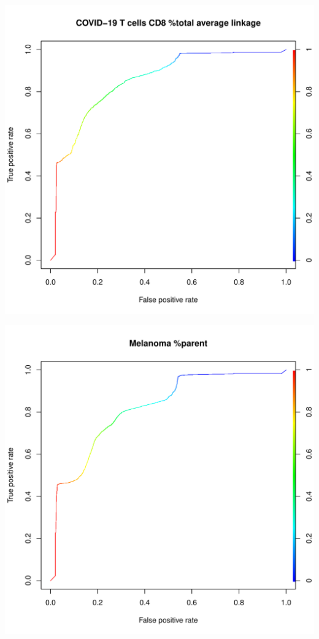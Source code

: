 \documentclass[11pt,a4paper,twoside]{report}\usepackage[]{graphicx}\usepackage[]{color}
\makeatletter
\def\maxwidth{ %
  \ifdim\Gin@nat@width>\linewidth
    \linewidth
  \else
    \Gin@nat@width
  \fi
}
\newenvironment{knitrout}{}{} %
\makeatother
\begin{document}
\begin{knitrout}
\includegraphics[width=\maxwidth]{figure/fig_code-11} 

\includegraphics[width=\maxwidth]{figure/fig_code-12} 


\end{knitrout}
\end{document}
